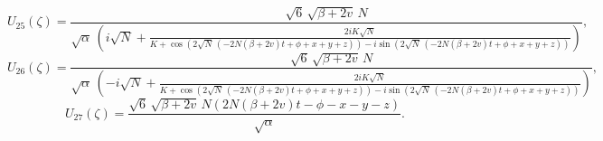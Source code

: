 \documentclass{article}
\numberwithin{equation}{section}
\begin{document}
\begin{equation}\label{U25}
U_{25} \! \left(\zeta \right) =
\frac{\sqrt{6}\, \sqrt{\beta +2 v}\, N}{\sqrt{\alpha}\, \left(i \sqrt{N}+\frac{2 i K \sqrt{N}}{K +\cos \left(2 \sqrt{N}\, \left(-2 N \left(\beta +2 v \right) t +\phi +x +y +z \right)\right)-i \sin \left(2 \sqrt{N}\, \left(-2 N \left(\beta +2 v \right) t +\phi +x +y +z \right)\right)}\right)},
\end{equation}
\begin{equation}\label{U26}
U_{26} \! \left(\zeta \right) =
\frac{\sqrt{6}\, \sqrt{\beta +2 v}\, N}{\sqrt{\alpha}\, \left(-i \sqrt{N}+\frac{2 i K \sqrt{N}}{K +\cos \left(2 \sqrt{N}\, \left(-2 N \left(\beta +2 v \right) t +\phi +x +y +z \right)\right)-i \sin \left(2 \sqrt{N}\, \left(-2 N \left(\beta +2 v \right) t +\phi +x +y +z \right)\right)}\right)},
\end{equation}
\begin{equation}\label{U27}
U_{27} \! \left(\zeta \right) =
\frac{\sqrt{6}\, \sqrt{\beta +2 v}\, N \left(2 N \left(\beta +2 v \right) t -\phi -x -y -z \right)}{\sqrt{\alpha}}.
\end{equation}

\newpage
\end{document}
